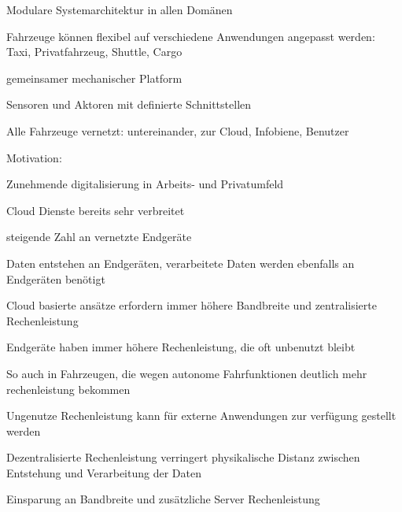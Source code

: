 \begin{notes}
        \begin{notes}
            \item Modulare Systemarchitektur in allen Domänen 
            \item Fahrzeuge können flexibel auf verschiedene Anwendungen angepasst werden: Taxi, Privatfahrzeug, Shuttle, Cargo
            \item gemeinsamer mechanischer Platform
            \item Sensoren und Aktoren mit definierte Schnittstellen
            \item Alle Fahrzeuge vernetzt: untereinander, zur Cloud, Infobiene, Benutzer 
        \end{notes}
    \item Motivation:
    \begin{notes}
        \item Zunehmende digitalisierung in Arbeits- und Privatumfeld
        \item Cloud Dienste bereits sehr verbreitet
        \item steigende Zahl an vernetzte Endgeräte
        \item Daten entstehen an Endgeräten, verarbeitete Daten werden ebenfalls an Endgeräten benötigt
        \item Cloud basierte ansätze erfordern immer höhere Bandbreite und zentralisierte Rechenleistung
        \item Endgeräte haben immer höhere Rechenleistung, die oft unbenutzt bleibt
        \item So auch in Fahrzeugen, die wegen autonome Fahrfunktionen deutlich mehr rechenleistung bekommen
        \item Ungenutze Rechenleistung kann für externe Anwendungen zur verfügung gestellt werden
        \item Dezentralisierte Rechenleistung verringert physikalische Distanz zwischen Entstehung und Verarbeitung der Daten
        \item Einsparung an Bandbreite und zusätzliche Server Rechenleistung
    \end{notes}
\end{notes} 